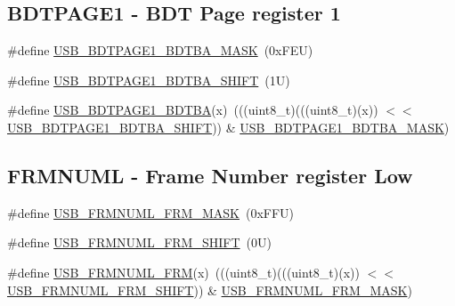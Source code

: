 \subsection*{B\+D\+T\+P\+A\+G\+E1 -\/ B\+DT Page register 1}
\begin{DoxyCompactItemize}
\item 
\#define \mbox{\hyperlink{group___u_s_b___register___masks_gacd2b27fefcff6f79e930e76d2a1a7b26}{U\+S\+B\+\_\+\+B\+D\+T\+P\+A\+G\+E1\+\_\+\+B\+D\+T\+B\+A\+\_\+\+M\+A\+SK}}~(0x\+F\+E\+U)
\item 
\#define \mbox{\hyperlink{group___u_s_b___register___masks_ga50c84ff08884c9825cf6c513f11aabe4}{U\+S\+B\+\_\+\+B\+D\+T\+P\+A\+G\+E1\+\_\+\+B\+D\+T\+B\+A\+\_\+\+S\+H\+I\+FT}}~(1\+U)
\item 
\#define \mbox{\hyperlink{group___u_s_b___register___masks_gaab031dcfd0867133f1d23dd92ef695ad}{U\+S\+B\+\_\+\+B\+D\+T\+P\+A\+G\+E1\+\_\+\+B\+D\+T\+BA}}(x)~(((uint8\+\_\+t)(((uint8\+\_\+t)(x)) $<$$<$ \mbox{\hyperlink{group___u_s_b___register___masks_ga50c84ff08884c9825cf6c513f11aabe4}{U\+S\+B\+\_\+\+B\+D\+T\+P\+A\+G\+E1\+\_\+\+B\+D\+T\+B\+A\+\_\+\+S\+H\+I\+FT}})) \& \mbox{\hyperlink{group___u_s_b___register___masks_gacd2b27fefcff6f79e930e76d2a1a7b26}{U\+S\+B\+\_\+\+B\+D\+T\+P\+A\+G\+E1\+\_\+\+B\+D\+T\+B\+A\+\_\+\+M\+A\+SK}})
\end{DoxyCompactItemize}
\subsection*{F\+R\+M\+N\+U\+ML -\/ Frame Number register Low}
\begin{DoxyCompactItemize}
\item 
\#define \mbox{\hyperlink{group___u_s_b___register___masks_ga197f6ef10431b69cb9b84fe7241a318a}{U\+S\+B\+\_\+\+F\+R\+M\+N\+U\+M\+L\+\_\+\+F\+R\+M\+\_\+\+M\+A\+SK}}~(0x\+F\+F\+U)
\item 
\#define \mbox{\hyperlink{group___u_s_b___register___masks_ga723c2de82420db0c349049ad6f66ad14}{U\+S\+B\+\_\+\+F\+R\+M\+N\+U\+M\+L\+\_\+\+F\+R\+M\+\_\+\+S\+H\+I\+FT}}~(0\+U)
\item 
\#define \mbox{\hyperlink{group___u_s_b___register___masks_gadd68274e4e3aa3763c3a5c36737188ff}{U\+S\+B\+\_\+\+F\+R\+M\+N\+U\+M\+L\+\_\+\+F\+RM}}(x)~(((uint8\+\_\+t)(((uint8\+\_\+t)(x)) $<$$<$ \mbox{\hyperlink{group___u_s_b___register___masks_ga723c2de82420db0c349049ad6f66ad14}{U\+S\+B\+\_\+\+F\+R\+M\+N\+U\+M\+L\+\_\+\+F\+R\+M\+\_\+\+S\+H\+I\+FT}})) \& \mbox{\hyperlink{group___u_s_b___register___masks_ga197f6ef10431b69cb9b84fe7241a318a}{U\+S\+B\+\_\+\+F\+R\+M\+N\+U\+M\+L\+\_\+\+F\+R\+M\+\_\+\+M\+A\+SK}})
\end{DoxyCompactItemize}
